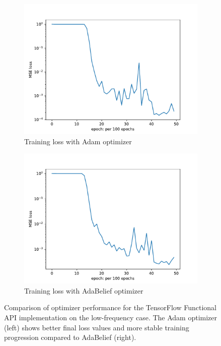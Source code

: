 \documentclass[10pt,journal,compsoc,onecolumn]{IEEEtran}
\begin{document}
\begin{figure}[htbp]
    \centering
    \begin{subfigure}[b]{0.45\textwidth}
        \includegraphics[width=\textwidth]{../../results/functional/low-frequency-adam-20250206-1105-1/loss}
        \caption{Training loss with Adam optimizer}
        \label{fig:adam_loss}
    \end{subfigure}
    \begin{subfigure}[b]{0.45\textwidth}
        \includegraphics[width=\textwidth]{../../results/functional/low-frequency-adabelief-20250206-1105-4/loss}
        \caption{Training loss with AdaBelief optimizer}
        \label{fig:adabelief_loss}
    \end{subfigure}
    \caption{Comparison of optimizer performance for the TensorFlow Functional API implementation on the low-frequency case. The Adam optimizer (left) shows better final loss values and more stable training progression compared to AdaBelief (right).}
    \label{fig:optimizer_comparison}
\end{figure}
\end{document}
